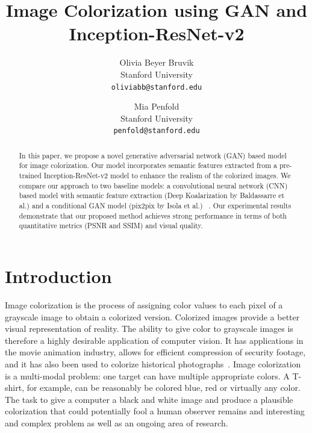 \documentclass[10pt,twocolumn,letterpaper]{article}
\begin{document}
\title{Image Colorization using GAN and Inception-ResNet-v2}

\author{Olivia Beyer Bruvik\\
Stanford University\\
{\tt\small oliviabb@stanford.edu}
\and
Mia Penfold\\
Stanford University\\
{\tt\small penfold@stanford.edu}
}

\maketitle

\begin{abstract}
   In this paper, we propose a novel generative adversarial network (GAN) based model for image colorization. Our model incorporates semantic features extracted from a pre-trained Inception-ResNet-v2 model to enhance the realism of the colorized images. We compare our approach to two baseline models: a convolutional neural network (CNN) based model with semantic feature extraction (Deep Koalarization by Baldassarre et al.) and a conditional GAN model (pix2pix by Isola et al.) ~\cite{Koalarization, Pix2Pix}. Our experimental results demonstrate that our proposed method achieves strong performance in terms of both quantitative metrics (PSNR and SSIM) and visual quality.
\end{abstract}

\section{Introduction}
Image colorization is the process of assigning color values to each pixel of a grayscale image to obtain a colorized version. Colorized images provide a better visual representation of reality. The ability to give color to grayscale images is therefore a highly desirable application of computer vision. It has applications in the movie animation industry, allows for efficient compression of security footage, and it has also been used to colorize historical photographs~\cite{Huang}.  Image colorization is a multi-modal problem: one target can have multiple appropriate colors. A T-shirt, for example, can be reasonably be colored blue, red or virtually any color. The task to give a computer a black and white image and produce a plausible colorization that could potentially fool a human observer remains and interesting and complex problem as well as an ongoing area of research.
\end{document}
